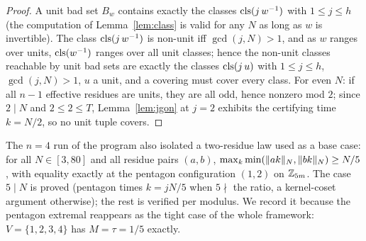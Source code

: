\begin{proof}
A unit bad set $B_w$ contains exactly the classes $\operatorname{cls}(j\,w^{-1})$ with
$1\le j\le h$ (the computation of Lemma~\ref{lem:class} is valid for any
$N$ as long as $w$ is invertible). The class $\operatorname{cls}(j\,w^{-1})$ is
non-unit iff $\gcd(j,N)>1$, and as $w$ ranges over units, $\operatorname{cls}(w^{-1})$
ranges over all unit classes; hence the non-unit classes reachable by unit
bad sets are exactly the classes $\operatorname{cls}(j\,u)$ with $1\le j\le h$,
$\gcd(j,N)>1$, $u$ a unit, and a covering must cover every class. For
even $N$: if all $n-1$ effective residues are units, they are all odd,
hence nonzero mod $2$; since $2\mid N$ and $2\le 2\le T$,
Lemma~\ref{lem:jgon} at $j=2$ exhibits the certifying time $k=N/2$, so
no unit tuple covers.
\end{proof}

\begin{remark}\label{rem:tworunner}
The $n=4$ run of the program also isolated a two-residue law used as a
base case: for all $N\in[3,80]$ and all residue pairs $(a,b)$,
$\max_k\min(\lVert ak \rVert_{N},\lVert bk \rVert_{N})\ge N/5$, with equality exactly at the
pentagon configuration $(1,2)$ on $\mathbb{Z}_{5m}$. The case $5\mid N$ is proved
(pentagon times $k=jN/5$ when $5\nmid$ the ratio, a kernel-coset argument
otherwise); the rest is verified per modulus. We record it because the
pentagon extremal reappears as the tight case of the whole framework:
$V=\{1,2,3,4\}$ has $M=\tau=1/5$ exactly.
\end{remark}
